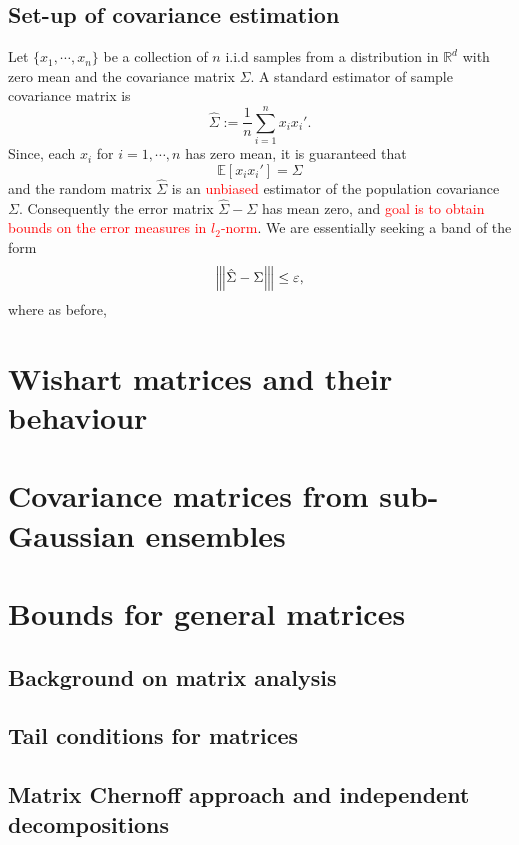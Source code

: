 \documentclass[10pt,handout,english]{beamer}
\newcommand{\E}{\mathbb{E}}
\newcommand{\R}{\mathbb{R}}
\newcommand{\vertiii}[1]{{\left\vert\kern-0.25ex\left\vert\kern-0.25ex\left\vert #1 
    \right\vert\kern-0.25ex\right\vert\kern-0.25ex\right\vert}}
\begin{document}
\subsection{Set-up of covariance estimation}
\frame{\tableofcontents[currentsection]}

\begin{frame}[allowframebreaks]
Let $\{x_1,\cdots,x_n\}$ be a collection of $n$ i.i.d samples from a distribution in $\R^d$ with zero mean and the covariance matrix $\Sigma$. A standard estimator of sample covariance matrix is
\[
\hat{\Sigma}:=\frac{1}{n}\sum\limits_{i=1}^{n}x_ix_i'.
\]
Since, each $x_i$ for $i=1,\cdots,n$ has zero mean, it is guaranteed that
\[
\E[x_ix_i']=\Sigma
\]
and the random matrix $\hat{\Sigma}$ is an \textcolor{red}{unbiased} estimator of the population covariance $\Sigma$. Consequently the error matrix $\hat{\Sigma}-\Sigma$ has mean zero, and \textcolor{red}{goal is to obtain bounds on the error measures in $l_2$-norm}. We are essentially seeking a band of the form
\[
\vertiii{\hat{\Sigma}-\Sigma}\leq\varepsilon,
\]
where as before, 
\end{frame}
\section{Wishart matrices and their behaviour}
\frame{\tableofcontents[currentsection]}


\section{Covariance matrices from sub-Gaussian ensembles}
\frame{\tableofcontents[currentsection]}

\section{Bounds for general matrices}
\subsection{Background on matrix analysis}


\subsection{Tail conditions for matrices}


\subsection{Matrix Chernoff approach and independent decompositions}
\end{document}
